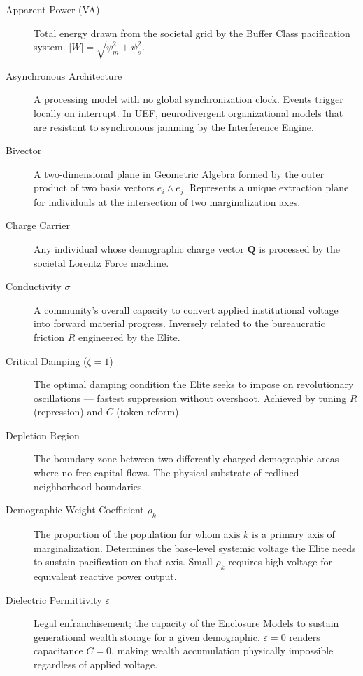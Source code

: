 \documentclass[12pt]{book}
\numberwithin{equation}{chapter}
\begin{document}
\begin{description}

\item[Apparent Power (VA)] 
Total energy drawn from the societal grid by the Buffer Class pacification system. $|W| = \sqrt{\psi_m^2 + \psi_s^2}$.

\item[Asynchronous Architecture] 
A processing model with no global synchronization clock. Events trigger locally on interrupt. In UEF, neurodivergent organizational models that are resistant to synchronous jamming by the Interference Engine.

\item[Bivector] 
A two-dimensional plane in Geometric Algebra formed by the outer product of two basis vectors $e_i \wedge e_j$. Represents a unique extraction plane for individuals at the intersection of two marginalization axes.

\item[Charge Carrier] 
Any individual whose demographic charge vector $\mathbf{Q}$ is processed by the societal Lorentz Force machine.

\item[Conductivity $\sigma$] 
A community's overall capacity to convert applied institutional voltage into forward material progress. Inversely related to the bureaucratic friction $R$ engineered by the Elite.

\item[Critical Damping ($\zeta = 1$)] 
The optimal damping condition the Elite seeks to impose on revolutionary oscillations — fastest suppression without overshoot. Achieved by tuning $R$ (repression) and $C$ (token reform).

\item[Depletion Region] 
The boundary zone between two differently-charged demographic areas where no free capital flows. The physical substrate of redlined neighborhood boundaries.

\item[Demographic Weight Coefficient $\rho_k$] 
The proportion of the population for whom axis $k$ is a primary axis of marginalization. Determines the base-level systemic voltage the Elite needs to sustain pacification on that axis. Small $\rho_k$ requires high voltage for equivalent reactive power output.

\item[Dielectric Permittivity $\varepsilon$] 
Legal enfranchisement; the capacity of the Enclosure Models to sustain generational wealth storage for a given demographic. $\varepsilon = 0$ renders capacitance $C = 0$, making wealth accumulation physically impossible regardless of applied voltage.


\end{description}
\end{document}
